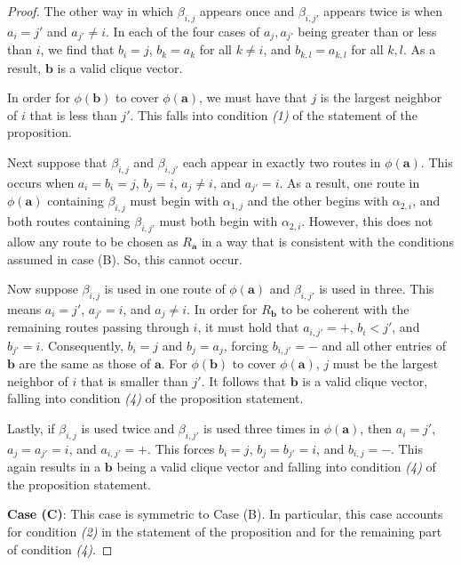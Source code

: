 \documentclass[10pt,a4paper]{amsart}
\newcommand\ba{\mathbf{a}}
\newcommand\bb{\mathbf{b}}
\begin{document}
\begin{proof}
    The other way in which $\beta_{i,j}$ appears once and $\beta_{i,j'}$ appears twice is when $a_i = j'$ and $a_{j'} \neq i$.
    In each of the four cases of $a_j,a_{j'}$ being greater than or less than $i$, we find that $b_i = j$, $b_k = a_k$ for all $k \neq i$, and $b_{k,l} = a_{k,l}$ for all $k,l$.
    As a result, $\bb$ is a valid clique vector.

    In order for $\phi(\bb)$ to cover $\phi(\ba)$, we must have that $j$ is the largest neighbor of $i$ that is less than $j'$. 
    This falls into condition \emph{(1)} of the statement of the proposition.

    Next suppose that $\beta_{i,j}$ and $\beta_{i,j'}$ each appear in exactly two routes in $\phi(\ba)$. 
    This occurs when $a_i = b_i = j$, $b_j = i$, $a_j \neq i$, and $a_{j'} = i$.
    As a result, one route in $\phi(\ba)$ containing $\beta_{i,j}$ must begin with $\alpha_{1,j}$ and the other begins with $\alpha_{2,i}$, and both routes containing $\beta_{i,j'}$ must both begin with $\alpha_{2,i}$.
    However, this does not allow any route to be chosen as $R_\ba$ in a way that is consistent with the conditions assumed in case (B).
    So, this cannot occur.

    Now suppose $\beta_{i,j}$ is used in one route of $\phi(\ba)$ and $\beta_{i,j'}$ is used in three.
    This means $a_i = j'$, $a_{j'} = i$, and $a_j \neq i$.
    In order for $R_\bb$ to be coherent with the remaining routes passing through $i$, it must hold that $a_{i,j'} = +$, $b_i < j'$, and $b_{j'} = i$.
    Consequently, $b_i = j$ and $b_j = a_j$, forcing $b_{i,j'} = -$ and all other entries of $\bb$ are the same as those of $\ba$. 
    For $\phi(\bb)$ to cover $\phi(\ba)$, $j$ must be the largest neighbor of $i$ that is smaller than $j'$.
    It follows that $\bb$ is a valid clique vector, falling into condition \emph{(4)} of the proposition statement.

    Lastly, if $\beta_{i,j}$ is used twice and $\beta_{i,j'}$ is used three times in $\phi(\ba)$, then $a_i = j'$, $a_j = a_{j'} = i$, and $a_{i,j'} = +$.
    This forces $b_i = j$, $b_j = b_{j'} = i$, and $b_{i,j} = -$.
    This again results in a $\bb$ being a valid clique vector and falling into condition \emph{(4)} of the proposition statement. 

    \textbf{Case (C)}: This case is symmetric to Case (B).
    In particular, this case accounts for condition \emph{(2)} in the statement of the proposition and for the remaining part of condition \emph{(4)}.


\end{proof}
\end{document}
